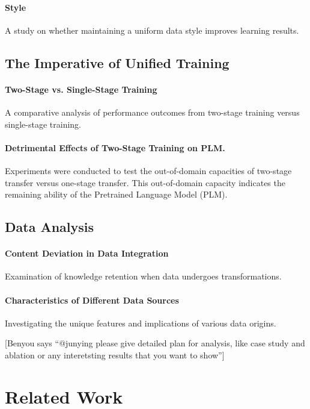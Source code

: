 \documentclass{article} %
\newcommand{\benyou}[1]{{ \color{blue} [Benyou says ``#1'']}}
\begin{document}
    \paragraph{Style}
    A study on whether maintaining a uniform data style improves learning results.

\subsection{The Imperative of Unified Training}
    \paragraph{Two-Stage vs. Single-Stage Training}
    A comparative analysis of performance outcomes from two-stage training versus single-stage training.
    
    \paragraph{Detrimental Effects of Two-Stage Training on PLM.}
    Experiments were conducted to test the out-of-domain capacities of two-stage transfer versus one-stage transfer. This out-of-domain capacity indicates the remaining ability of the Pretrained Language Model (PLM).


\subsection{Data Analysis}
    \paragraph{Content Deviation in Data Integration}
    Examination of knowledge retention when data undergoes transformations.

    \paragraph{Characteristics of Different Data Sources}
    Investigating the unique features and implications of various data origins.




\benyou{@junying please give detailed plan for analysis, like case study and ablation or any interetsting results that you want to show}



\section{Related Work}
\end{document}
